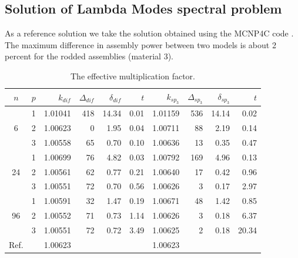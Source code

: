 \documentclass[a4paper]{jpconf}
\begin{document}
\subsection{Solution of Lambda Modes spectral problem}
As a reference solution we take the solution obtained using the MCNP4C code \cite{bahabadi2016}. 
The maximum difference in assembly power between two models is about 2 percent for the rodded assemblies (material 3).
\begin{table}[htp]
\caption{The effective multiplication factor.}
\label{tab:iaea_with_lambda}
\begin{center}
\begin{tabular}{c c r r r r r r r r}
\hline
$n$ & $p$ & $k_{dif}$ & $\Delta_{dif}$ & $\delta_{dif}$ &$t$ &$k_{sp_3}$& $\Delta_{sp_3}$ & $\delta_{sp_3}$ &$t$ \\
\hline
	& 1	& 1.01041& 418&14.34& 0.01& 1.01159& 536& 14.14 &0.02\\
6	& 2	& 1.00623&   0& 1.95& 0.04& 1.00711&  88&  2.19 &0.14\\
	& 3	& 1.00558&  65& 0.70& 0.10& 1.00636&  13&  0.35 &0.47\\ 
\hline
	& 1	& 1.00699&  76& 4.82& 0.03& 1.00792& 169&  4.96 &0.13\\
24& 2	& 1.00561&  62& 0.77& 0.21& 1.00640&  17&  0.42 &0.96\\
	& 3	& 1.00551&  72& 0.70& 0.56& 1.00626&   3&  0.17 &2.97\\ 
\hline
	& 1	& 1.00591&  32& 1.47& 0.19& 1.00671&  48&  1.42 &0.85\\
96& 2	& 1.00552&  71& 0.73& 1.14& 1.00626&   3&  0.18 &6.37\\
	& 3	& 1.00551&  72& 0.72& 3.49& 1.00625&   2&  0.18 &20.34\\ 
\hline
Ref.&   & 1.00623&    &     &     & 1.00623&    &       &\\ 
\hline
\end{tabular}
\end{center}
\end{table}
\end{document}
